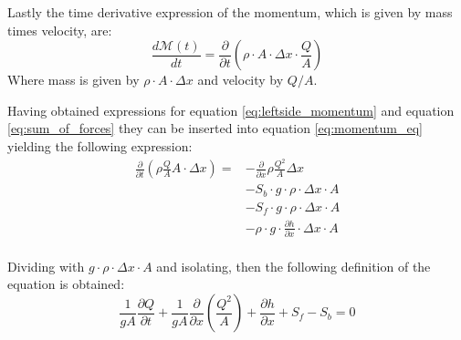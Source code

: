 Lastly the time derivative expression of the momentum, which is given by mass times velocity, are:
\begin{equation}\label{eq:leftside_momentum}
\frac{d \mathcal{M}(t)}{dt}=	\frac{\partial}{\partial t} \left(\rho \cdot A \cdot \Delta x \cdot \frac{Q}{A}\right)
\end{equation}
Where mass is given by $\rho \cdot A \cdot \Delta x$ and velocity by $Q / A$.

Having obtained expressions for equation \ref{eq:leftside_momentum} and equation \ref{eq:sum_of_forces} they can be inserted into equation \ref{eq:momentum_eq} yielding the following expression:
\begin{equation}
\begin{aligned}
\frac{\partial}{\partial t} (\rho \frac{Q}{A}A\cdot \Delta x) =& - \frac{\partial}{\partial x} \rho \frac{Q^2}{A}\Delta x \\
&-S_b \cdot g \cdot \rho \cdot \Delta x \cdot A \\
&-S_f \cdot g \cdot \rho \cdot \Delta x \cdot A \\ 
&-\rho\cdot g \cdot \frac{\partial h}{\partial x} \cdot \Delta x \cdot A 
\end{aligned}
\end{equation}
\\
Dividing with $g \cdot \rho \cdot \Delta x \cdot A$ and isolating, then the following definition of the equation is obtained:
\\
\begin{equation}
\boxed{\frac{1}{gA} \frac{\partial Q}{\partial t} +\frac{1}{gA}\frac{\partial}{\partial x} \left( \frac{Q^2}{A} \right) + \frac{\partial h}{\partial x} + S_f - S_b = 0}
\label{saintbernard_momentum}
\end{equation}
\\

